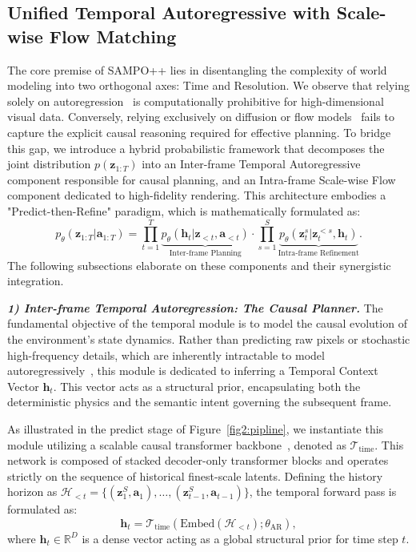 \subsection{Unified Temporal Autoregressive with Scale-wise Flow Matching}
\label{Sec3:UnifiedFramework}
The core premise of SAMPO++ lies in disentangling the complexity of world modeling into two orthogonal axes: Time and Resolution. We observe that relying solely on autoregression~\cite{esser2021taming,wu2024ivideogpt,brown2020language,yan2021videogpt} is computationally prohibitive for high-dimensional visual data. Conversely, relying exclusively on diffusion or flow models~\cite{blattmann2023stable,zhu2024sora,lipman2023flow,dao2023flow} fails to capture the explicit causal reasoning required for effective planning.
To bridge this gap, we introduce a hybrid probabilistic framework that decomposes the joint distribution $p(\boldsymbol{z}_{1:T})$ into an Inter-frame Temporal Autoregressive component responsible for causal planning, and an Intra-frame Scale-wise Flow component dedicated to high-fidelity rendering. This architecture embodies a "Predict-then-Refine" paradigm, which is mathematically formulated as:
\begin{equation}
    p_\theta(\boldsymbol{z}_{1:T} | \boldsymbol{a}_{1:T}) = \prod_{t=1}^{T} \underbrace{p_\theta(\boldsymbol{h}_t | \boldsymbol{z}_{<t}, \boldsymbol{a}_{<t})}_{\text{Inter-frame Planning}} \cdot \prod_{s=1}^{S} \underbrace{p_\theta(\boldsymbol{z}_t^s | \boldsymbol{z}_t^{<s}, \boldsymbol{h}_t)}_{\text{Intra-frame Refinement}}.
\end{equation}
The following subsections elaborate on these components and their synergistic integration.

\noindent \textit{\textbf{1) Inter-frame Temporal Autoregression: The Causal Planner.}}
The fundamental objective of the temporal module is to model the causal evolution of the environment's state dynamics. Rather than predicting raw pixels or stochastic high-frequency details, which are inherently intractable to model autoregressively~\cite{van2016pixel, yan2021videogpt}, this module is dedicated to inferring a Temporal Context Vector $\boldsymbol{h}_t$. This vector acts as a structural prior, encapsulating both the deterministic physics and the semantic intent governing the subsequent frame.

As illustrated in the predict stage of Figure~\ref{fig2:pipline}, we instantiate this module utilizing a scalable causal transformer backbone~\cite{tian2024visual}, denoted as $\mathcal{T}_{\text{time}}$. This network is composed of stacked decoder-only transformer blocks and operates strictly on the sequence of historical finest-scale latents. Defining the history horizon as $\mathcal{H}_{<t} = \{ (\boldsymbol{z}_{1}^S, \boldsymbol{a}_{1}), \dots, (\boldsymbol{z}_{t-1}^S, \boldsymbol{a}_{t-1}) \}$, the temporal forward pass is formulated as:
\begin{equation}
    \boldsymbol{h}_t = \mathcal{T}_{\text{time}}(\text{Embed}(\mathcal{H}_{<t}); \theta_{\text{AR}}),
\end{equation}
where $\boldsymbol{h}_t \in \mathbb{R}^{D}$ is a dense vector acting as a global structural prior for time step $t$.

